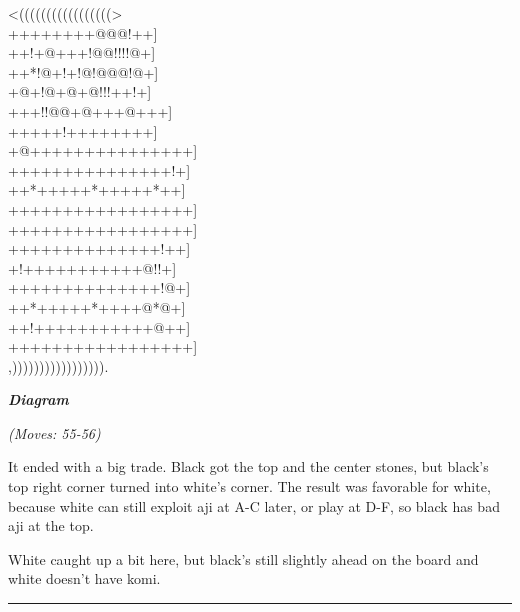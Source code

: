\documentclass[letterpaper,12pt]{memoir}
\newcounter{GoFigure}[part]
\newcommand{\gofigure}{%
 \stepcounter{GoFigure}
 \centerline{\textit{\textbf{Diagram \arabic{GoFigure}}}}
}
\newcommand{\subtext}[1]{\centerline{\textit{#1}}}
\begin{document}
\begin{minipage}[t]{240pt}
\label{Fujisawa-Hosai-vs-Go-Seigen-19430225:0:mainmove-55}
{\gnos
<(((((((((((((((((>\\
++++++++@@@!++]\\
++!+@+++!@@!!!!@+]\\
++*!@+!+!@!@@@!@+]\\
+@+!@+@+@!!!++!+]\\
+++!!@@+@+++@+++]\\
+++++!++++++++]\\
+@+++++++++++++++]\\
+++++++++++++++!+]\\
++*+++++*+++++*++]\\
+++++++++++++++++]\\
+++++++++++++++++]\\
++++++++++++++!++]\\
+!+++++++++++@!!+]\\
++++++++++++++!@+]\\
++*+++++*++++@*@+]\\
++!+++++++++++@++]\\
+++++++++++++++++]\\
,))))))))))))))))).\\
}
\gofigure
\subtext{(Moves: 55-56)}
\end{minipage}
\begin{minipage}[t]{115.19999999999999pt}
\setlength{\parskip}{0.5em}
It ended with a big trade. Black got the top and the center stones, but black's top right corner turned into white's corner. The result was favorable for white, because white can still exploit aji at A-C later, or play at D-F, so black has bad aji at the top.

White caught up a bit here, but black's still slightly ahead on the board and white doesn't have komi.


\end{minipage}
\vfill

\rule{\textwidth}{0.5pt}
\end{document}

